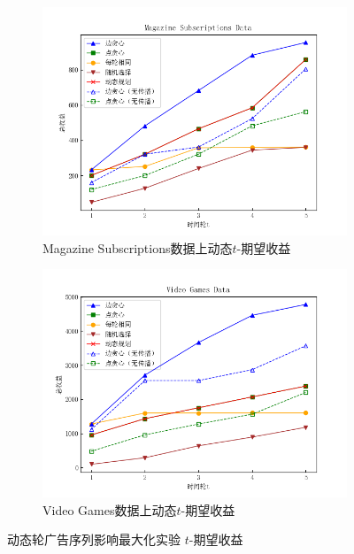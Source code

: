 \begin{figure}[th]
    \begin{subfigure}{0.45\textwidth}
       \includegraphics[width=\linewidth]{figure/sasim/adp/adp_cn_magazine}
        \caption{Magazine Subscriptions数据上动态$t$-期望收益}
        \label{fig:adp3}
    \end{subfigure}
    \hfill
    \begin{subfigure}{0.45\textwidth}
        \includegraphics[width=\linewidth]{figure/sasim/adp/adp_cn_video}
        \caption{Video Games数据上动态$t$-期望收益}
        \label{fig:adp4}
    \end{subfigure}
    \caption{动态轮广告序列影响最大化实验 $t$-期望收益}
    \label{fig:adp}
\end{figure}

